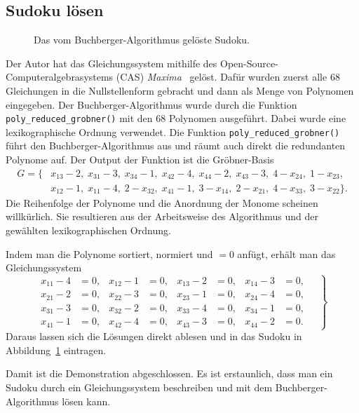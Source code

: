 \subsection{Sudoku lösen
\label{buchberger:subsection:sudoku-loesen}}
\begin{figure}
  \centering
  
  \caption{Das vom Buchberger-Algorithmus gelöste Sudoku.
  \label{buchberger:sudokuSolved}}
\end{figure}
Der Autor hat das Gleichungssystem mithilfe des Open-Source-Computeralgebrasystems (CAS) \emph{Maxima}~\cite{buchberger:maxima-github} gelöst.
Dafür wurden zuerst alle 68 Gleichungen in die Nullstellenform gebracht und dann als Menge von Polynomen eingegeben.
Der Buchberger-Algorithmus wurde durch die Funktion \texttt{poly\_reduced\_grobner()} mit den 68 Polynomen ausgeführt.
Dabei wurde eine lexikographische Ordnung verwendet.
Die Funktion \texttt{poly\_reduced\_\-grobner()} führt den Buchberger-Algorithmus aus und räumt auch direkt die redundanten Polynome auf.
Der Output der Funktion ist die Gröbner-Basis
\[
\begin{aligned}
  G = \{ & x_{13} - 2, \; x_{31} - 3, \; x_{34} - 1, \; x_{42} - 4, \; x_{44} - 2, \; x_{43} - 3, \; 4 - x_{24}, \; 1 - x_{23}, \\
         & x_{12} - 1, \; x_{11} - 4, \; 2 - x_{32}, \; x_{41} - 1, \; 3 - x_{14}, \; 2 - x_{21}, \; 4 - x_{33}, \; 3 - x_{22} \}.
\end{aligned}
\]
Die Reihenfolge der Polynome und die Anordnung der Monome scheinen willkürlich.
Sie resultieren aus der Arbeitsweise des Algorithmus und der gewählten lexikographischen Ordnung.

Indem man die Polynome sortiert, normiert und $= 0$ anfügt, erhält man das Gleichungssystem
\begin{equation}
  \left.
  \begin{aligned}
    x_{11} - 4 &= 0,&
    x_{12} - 1 &= 0,&
    x_{13} - 2 &= 0,&
    x_{14} - 3 &= 0,\\
    x_{21} - 2 &= 0,&
    x_{22} - 3 &= 0,&
    x_{23} - 1 &= 0,&
    x_{24} - 4 &= 0,\\
    x_{31} - 3 &= 0,&
    x_{32} - 2 &= 0,&
    x_{33} - 4 &= 0,&
    x_{34} - 1 &= 0,\\
    x_{41} - 1 &= 0,&
    x_{42} - 4 &= 0,&
    x_{43} - 3 &= 0,&
    x_{44} - 2 &= 0.
  \end{aligned}
  \quad
  \right\}
  \label{buchberger:sudoku-end-loesung}
\end{equation}
Daraus lassen sich die Lösungen direkt ablesen und in das Sudoku in Abbildung~\ref{buchberger:sudokuSolved} eintragen.

Damit ist die Demonstration abgeschlossen.
Es ist erstaunlich, dass man ein Sudoku durch ein Gleichungssystem beschreiben und mit dem Buchberger-Algorithmus lösen kann.
